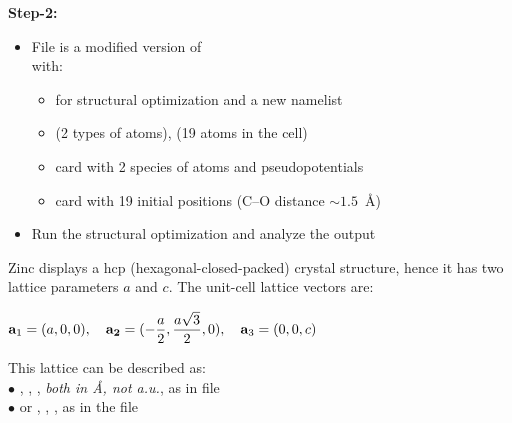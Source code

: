 \documentclass[landscape]{foils}
\begin{document}
{\bf Step-2:}
\vspace{-1em}
\begin{itemize}
\item File  is a modified version of\\
   with:
  \begin{itemize}  
  \item {} for structural optimization and a new
    namelist 
  \item {} (2 types of atoms), 
    (19 atoms in the cell)
  \item {} card with 2 species of atoms and
    pseudopotentials
  \item {} card with 19 initial positions
    (C--O distance $\sim 1.5$~\AA)
  \end{itemize}
\item Run the structural optimization and analyze the output
\end{itemize}

%
Zinc displays a hcp (hexagonal-closed-packed) crystal structure, hence
it has two lattice parameters $a$ and $c$. The unit-cell lattice
vectors are:\\
%
\centerline{$\displaystyle
  {\bf a}_1=(a,0,0), \quad {\bf a_2}=(-{a\over 2},{a\sqrt{3}\over 2},0),
  \quad {\bf a}_3=(0,0,c)$}
%
This lattice can be described as:\\
$\bullet$ , , , {\em both in \AA,
  not a.u.}, as in file \\
$\bullet$ or , , ,
as in the file 
\end{document}
